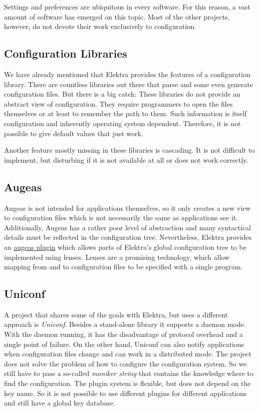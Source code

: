 Settings and preferences are ubiquitous in every software. For this reason, a vast amount of software has emerged on this topic. Most of the other projects, however, do not devote their work exclusively to configuration.

\subsection*{Configuration Libraries}

We have already mentioned that Elektra provides the features of a configuration library. There are countless libraries out there that parse and some even generate configuration files. But there is a big catch\+: These libraries do not provide an abstract view of configuration. They require programmers to open the files themselves or at least to remember the path to them. Such information is itself configuration and inherently operating system dependent. Therefore, it is not possible to give default values that just work.

Another feature mostly missing in these libraries is cascading. It is not difficult to implement, but disturbing if it is not available at all or does not work correctly.

\subsection*{Augeas}

Augeas is not intended for applications themselves, so it only creates a new view to configuration files which is not necessarily the same as applications see it. Additionally, Augeas has a rather poor level of abstraction and many syntactical details must be reflected in the configuration tree. Nevertheless, Elektra provides an \hyperlink{md_src_plugins_augeas_README_src_plugins_augeas_README_md}{augeas plugin} which allows parts of Elektra’s global configuration tree to be implemented using lenses. Lenses are a promising technology, which allow mapping from and to configuration files to be specified with a single program.

\subsection*{Uniconf}

A project that shares some of the goals with Elektra, but uses a different approach is {\itshape Uniconf}. Besides a stand-\/alone library it supports a daemon mode. With the daemon running, it has the disadvantage of protocol overhead and a single point of failure. On the other hand, Uniconf can also notify applications when configuration files change and can work in a distributed mode. The project does not solve the problem of how to configure the configuration system. So we still have to pass a so-\/called {\itshape moniker string} that contains the knowledge where to find the configuration. The plugin system is flexible, but does not depend on the key name. So it is not possible to use different plugins for different applications and still have a global key database.

